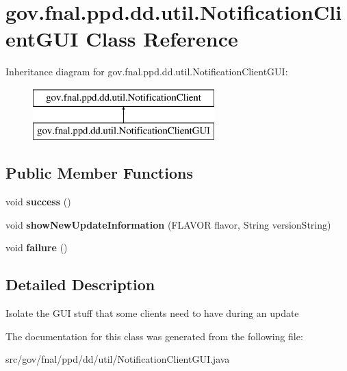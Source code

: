 \hypertarget{classgov_1_1fnal_1_1ppd_1_1dd_1_1util_1_1NotificationClientGUI}{\section{gov.\-fnal.\-ppd.\-dd.\-util.\-Notification\-Client\-G\-U\-I Class Reference}
\label{classgov_1_1fnal_1_1ppd_1_1dd_1_1util_1_1NotificationClientGUI}
}
Inheritance diagram for gov.\-fnal.\-ppd.\-dd.\-util.\-Notification\-Client\-G\-U\-I\-:\begin{figure}[H]
\begin{center}
\leavevmode
\includegraphics[height=2.000000cm]{classgov_1_1fnal_1_1ppd_1_1dd_1_1util_1_1NotificationClientGUI}
\end{center}
\end{figure}
\subsection*{Public Member Functions}
\begin{DoxyCompactItemize}
\item 
\hypertarget{classgov_1_1fnal_1_1ppd_1_1dd_1_1util_1_1NotificationClientGUI_a114fad00decbffa337cd0372ee451169}{void {\bfseries success} ()}\label{classgov_1_1fnal_1_1ppd_1_1dd_1_1util_1_1NotificationClientGUI_a114fad00decbffa337cd0372ee451169}

\item 
\hypertarget{classgov_1_1fnal_1_1ppd_1_1dd_1_1util_1_1NotificationClientGUI_a37ef05c2a1ea25b71fcac14cc433013e}{void {\bfseries show\-New\-Update\-Information} (F\-L\-A\-V\-O\-R flavor, String version\-String)}\label{classgov_1_1fnal_1_1ppd_1_1dd_1_1util_1_1NotificationClientGUI_a37ef05c2a1ea25b71fcac14cc433013e}

\item 
\hypertarget{classgov_1_1fnal_1_1ppd_1_1dd_1_1util_1_1NotificationClientGUI_ae82c57fd5a6d3344212edac93f9c0170}{void {\bfseries failure} ()}\label{classgov_1_1fnal_1_1ppd_1_1dd_1_1util_1_1NotificationClientGUI_ae82c57fd5a6d3344212edac93f9c0170}

\end{DoxyCompactItemize}


\subsection{Detailed Description}
Isolate the G\-U\-I stuff that some clients need to have during an update 

The documentation for this class was generated from the following file\-:\begin{DoxyCompactItemize}
\item 
src/gov/fnal/ppd/dd/util/Notification\-Client\-G\-U\-I.\-java\end{DoxyCompactItemize}

